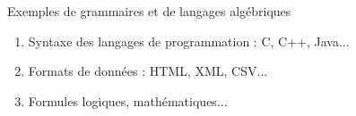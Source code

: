 \begin{frame}{Exemples de grammaires et de langages algébriques}
\begin{enumerate}
  \item Syntaxe des langages de programmation : C, C++, Java...\vspace{2mm}
    
  \item Formats de données : HTML, XML, CSV...\vspace{2mm}
    
  \item Formules logiques, mathématiques...
  \end{enumerate}
\end{frame}

\endgroup
